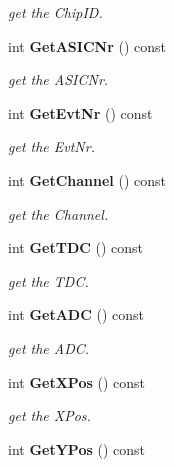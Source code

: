\begin{DoxyCompactItemize}
\begin{DoxyCompactList}\small\item\em get the Chip\-I\-D. \end{DoxyCompactList}\item 
int {\bf Get\-A\-S\-I\-C\-Nr} () const \label{classCALICE_1_1LabviewBlock_a20b34eb84745f2fb035daebcec6c8eb8}

\begin{DoxyCompactList}\small\item\em get the A\-S\-I\-C\-Nr. \end{DoxyCompactList}\item 
int {\bf Get\-Evt\-Nr} () const \label{classCALICE_1_1LabviewBlock_a15229cd3b6b44ef7fcabb3d7f8b7cbf4}

\begin{DoxyCompactList}\small\item\em get the Evt\-Nr. \end{DoxyCompactList}\item 
int {\bf Get\-Channel} () const \label{classCALICE_1_1LabviewBlock_a56f8ebcbbff0a314b7b647900e677549}

\begin{DoxyCompactList}\small\item\em get the Channel. \end{DoxyCompactList}\item 
int {\bf Get\-T\-D\-C} () const \label{classCALICE_1_1LabviewBlock_aabb31d4cb06168df0acd5126b05ad801}

\begin{DoxyCompactList}\small\item\em get the T\-D\-C. \end{DoxyCompactList}\item 
int {\bf Get\-A\-D\-C} () const \label{classCALICE_1_1LabviewBlock_a1f4937a4b2e883ecf0364b7369cd3708}

\begin{DoxyCompactList}\small\item\em get the A\-D\-C. \end{DoxyCompactList}\item 
int {\bf Get\-X\-Pos} () const \label{classCALICE_1_1LabviewBlock_aeb75ea8ea414ef184e30d8c6a967a5f6}

\begin{DoxyCompactList}\small\item\em get the X\-Pos. \end{DoxyCompactList}\item 
int {\bf Get\-Y\-Pos} () const \label{classCALICE_1_1LabviewBlock_a42495a34bc8c54fd5f26a8de2eb17584}


\end{DoxyCompactItemize}
